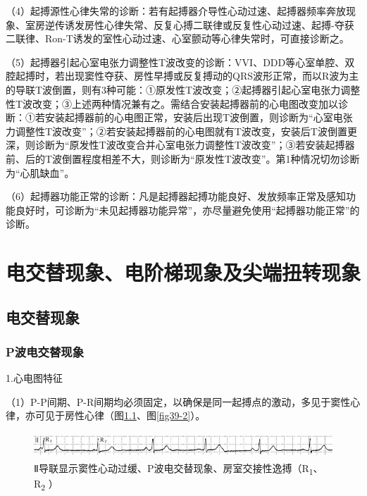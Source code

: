 （4）起搏源性心律失常的诊断：若有起搏器介导性心动过速、起搏器频率奔放现象、室房逆传诱发房性心律失常、反复心搏二联律或反复性心动过速、起搏-夺获二联律、Ron-T诱发的室性心动过速、心室颤动等心律失常时，可直接诊断之。

（5）起搏器引起心室电张力调整性T波改变的诊断：VVI、DDD等心室单腔、双腔起搏时，若出现窦性夺获、房性早搏或反复搏动的QRS波形正常，而以R波为主的导联T波倒置，则有3种可能：①原发性T波改变；②起搏器引起心室电张力调整性T波改变；③上述两种情况兼有之。需结合安装起搏器前的心电图改变加以诊断：①若安装起搏器前的心电图正常，安装后出现T波倒置，则诊断为“心室电张力调整性T波改变”；②若安装起搏器前的心电图就有T波改变，安装后T波倒置更深，则诊断为“原发性T波改变合并心室电张力调整性T波改变”；③若安装起搏器前、后的T波倒置程度相差不大，则诊断为“原发性T波改变”。第1种情况切勿诊断为“心肌缺血”。

（6）起搏器功能正常的诊断：凡是起搏器起搏功能良好、发放频率正常及感知功能良好时，可诊断为“未见起搏器功能异常”，亦尽量避免使用“起搏器功能正常”的诊断。

\protect\hypertarget{text00046.html}{}{}

\protect\hypertarget{text00046.htmlux5cux23chapter46}{}{}

\chapter{电交替现象、电阶梯现象及尖端扭转现象}

\protect\hypertarget{text00046.htmlux5cux23subid510}{}{}

\section{电交替现象}

\protect\hypertarget{text00046.htmlux5cux23subid511}{}{}

\subsection{P波电交替现象}

1.心电图特征

（1）P-P间期、P-R间期均必须固定，以确保是同一起搏点的激动，多见于窦性心律，亦可见于房性心律（图\ref{fig39-1}、图\ref{fig39-2}）。

\begin{figure}[!htbp]
 \centering
 \includegraphics[width=5.58333in,height=0.375in]{./images/Image00650.jpg}
 \captionsetup{justification=centering}
 \caption{Ⅱ导联显示窦性心动过缓、P波电交替现象、房室交接性逸搏（R\textsubscript{1}、R\textsubscript{2} ）}
 \label{fig39-1}
  \end{figure} 


